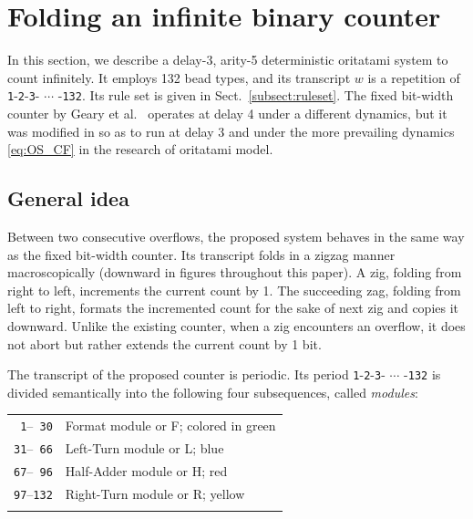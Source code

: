 \documentclass[twocolumn]{svjour3}
\begin{document}
	\section{Folding an infinite binary counter}
	\label{sect:detail}

In this section, we describe a delay-3, arity-5 deterministic oritatami system to count infinitely. 
It employs 132 bead types, and its transcript $w$ is a repetition of \texttt{1}-\texttt{2}-\texttt{3}- $\cdots$ -\texttt{132}. 
Its rule set is given in Sect.~\ref{subsect:ruleset}. 
The fixed bit-width counter by Geary et al.~\cite{GeMeScSe2019} operates at delay 4 under a different dynamics, but it was modified in \cite{MasudaSekiUbukata2018} so as to run at delay 3 and under the more prevailing dynamics \eqref{eq:OS_CF} in the research of oritatami model. 

\subsection{General idea}
Between two consecutive overflows, the proposed system behaves in the same way as the fixed bit-width counter.
Its transcript folds in a zigzag manner macroscopically (downward in figures throughout this paper).
A zig, folding from right to left, increments the current count by 1.
The succeeding zag, folding from left to right, formats the incremented count for the sake of next zig and copies it downward.
Unlike the existing counter, when a zig encounters an overflow, it does not abort but rather extends the current count by 1 bit.



The transcript of the proposed counter is periodic.
Its period \texttt{1}-\texttt{2}-\texttt{3}- $\cdots$ -\texttt{132} is divided semantically into the following four subsequences, called \textit{modules}: \\
\begin{tabular}{rl}
\\
\texttt{ 1}--\texttt{ 30} & Format module or F; colored in green \\
\texttt{31}--\texttt{ 66} & Left-Turn module or L; blue \\
\texttt{67}--\texttt{ 96} & Half-Adder module or H; red \\
\texttt{97}--\texttt{132} & Right-Turn module  or R; yellow \\
\\
\end{tabular}
\end{document}
